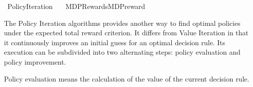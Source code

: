 %
\begin{isabellebody}%
%
%
\isadelimtheory
\isanewline
\isanewline
%
\endisadelimtheory
%
\isatagtheory
{}\isamarkupfalse%
\ Policy{\isacharunderscore}{\kern0pt}Iteration\isanewline
\ \ \ {\isachardoublequoteopen}MDP{\isacharminus}{\kern0pt}Rewards{\isachardot}{\kern0pt}MDP{\isacharunderscore}{\kern0pt}reward{\isachardoublequoteclose}\isanewline
\isanewline
{}%
\endisatagtheory
{\isafoldtheory}%
%
\isadelimtheory
%
\endisadelimtheory
%
\isadelimdocument
%
\endisadelimdocument
%
\isatagdocument
%
\isamarkuptrue%
%
\endisatagdocument
{\isafolddocument}%
%
\isadelimdocument
%
\endisadelimdocument
%
\begin{isamarkuptext}%
The Policy Iteration algorithms provides another way to find optimal policies under the expected 
total reward criterion.
It differs from Value Iteration in that it continuously improves an initial guess for an optimal 
decision rule. Its execution can be subdivided into two alternating steps: policy evaluation and 
policy improvement.

Policy evaluation means the calculation of the value of the current decision rule.


\end{isamarkuptext}
\end{isabellebody}
